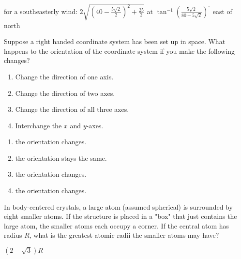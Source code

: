 \begin{exercises}
\begin{problist}
\begin{solution}
\begin{enumerate}
                        for a southeasterly wind:
                        $2\sqrt{\left(40-\frac{5\sqrt{2}}{2}\right)^2 + \frac{25}{2}}$ at
                        $\tan^{-1}\left(\frac{5\sqrt{2}}{80-5\sqrt{2}}\right)^\circ$
                        east of north
                \end{enumerate}
            \end{solution}

		\prob  Suppose a right handed coordinate system has been set up in space.  What happens
			to the orientation of the coordinate system if you make the following changes?
            \begin{enumerate}
                \item   Change the direction of one axis.
                \item   Change the direction of two axes.
                \item   Change the direction of all three axes.
                \item   Interchange the $x$ and $y$-axes.
            \end{enumerate}
            \begin{solution}
                \begin{enumerate}
                    \item   the orientation changes.
                    \item   the orientation stays the same.
                    \item   the orientation changes.
                    \item   the orientation changes.
                \end{enumerate}
            \end{solution}

		\prob  In body-centered crystals, a large atom (assumed spherical) is surrounded by
			eight smaller atoms.  If the structure is placed in a "box" that just contains
			the large atom, the smaller atoms each occupy a corner.  If the central atom has
			radius $R$, what is the greatest atomic radii the smaller atoms may have?
            \begin{solution}
                $(2 - \sqrt{3})R$
            \end{solution}


\end{problist}
\end{exercises}
